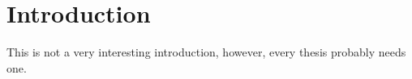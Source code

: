 \chapter{Introduction}

This is not a very interesting introduction, however, every thesis probably
needs one.
